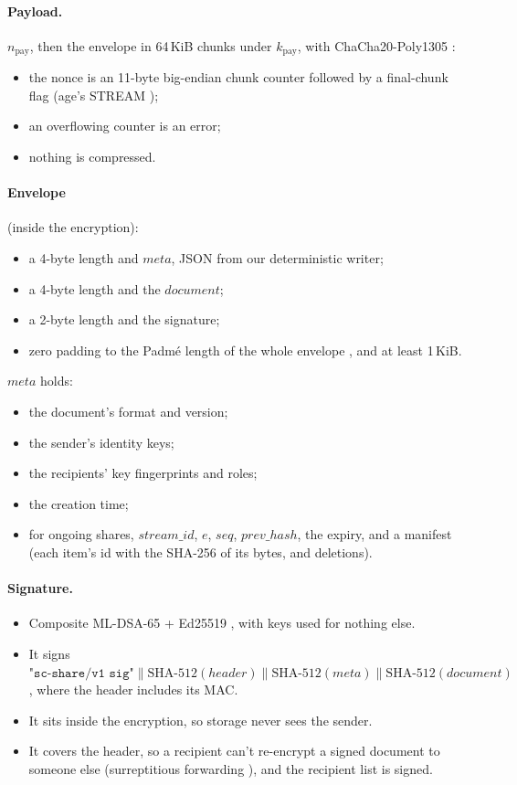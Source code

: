 \documentclass[11pt,a4paper]{article}
\newcommand{\concat}{\mathbin{\|}}
\newcommand{\str}[1]{\texttt{"#1"}}
\begin{document}
\paragraph{Payload.} $n_{\mathrm{pay}}$, then the envelope in 64\,KiB chunks under $k_{\mathrm{pay}}$, with ChaCha20-Poly1305 \cite{rfc8439}:
\begin{itemize}
  \item the nonce is an 11-byte big-endian chunk counter followed by a final-chunk flag (age's STREAM \cite{stream});
  \item an overflowing counter is an error;
  \item nothing is compressed.
\end{itemize}

\paragraph{Envelope} (inside the encryption):
\begin{itemize}
  \item a 4-byte length and $\mathit{meta}$, JSON from our deterministic writer;
  \item a 4-byte length and the $\mathit{document}$;
  \item a 2-byte length and the signature;
  \item zero padding to the Padm\'e length of the whole envelope \cite{padme}, and at least 1\,KiB.
\end{itemize}
$\mathit{meta}$ holds:
\begin{itemize}
  \item the document's format and version;
  \item the sender's identity keys;
  \item the recipients' key fingerprints and roles;
  \item the creation time;
  \item for ongoing shares, $\mathit{stream\_id}$, $e$, $\mathit{seq}$, $\mathit{prev\_hash}$, the expiry, and a manifest (each item's id with the SHA-256 of its bytes, and deletions).
\end{itemize}

\paragraph{Signature.}
\begin{itemize}
  \item Composite ML-DSA-65 + Ed25519 \cite{compsig}, with keys used for nothing else.
  \item It signs $\str{sc-share/v1 sig} \concat \mathrm{SHA\text{-}512}(\mathit{header}) \concat \mathrm{SHA\text{-}512}(\mathit{meta}) \concat \mathrm{SHA\text{-}512}(\mathit{document})$, where the header includes its MAC.
  \item It sits inside the encryption, so storage never sees the sender.
  \item It covers the header, so a recipient can't re-encrypt a signed document to someone else (surreptitious forwarding \cite{davis}), and the recipient list is signed.
\end{itemize}
\end{document}
